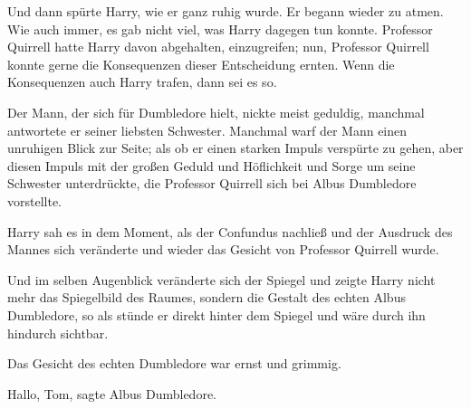 Und dann spürte Harry, wie er ganz ruhig wurde. Er begann wieder zu atmen. Wie
auch immer, es gab nicht viel, was Harry dagegen tun konnte. Professor Quirrell
hatte Harry davon abgehalten, einzugreifen; nun, Professor Quirrell konnte gerne
die Konsequenzen dieser Entscheidung ernten. Wenn die Konsequenzen auch Harry
trafen, dann sei es so.

Der Mann, der sich für Dumbledore hielt, nickte meist geduldig, manchmal
antwortete er seiner liebsten Schwester. Manchmal warf der Mann einen unruhigen
Blick zur Seite; als ob er einen starken Impuls verspürte zu gehen, aber diesen
Impuls mit der großen Geduld und Höflichkeit und Sorge um seine Schwester
unterdrückte, die Professor Quirrell sich bei Albus Dumbledore vorstellte.

Harry sah es in dem Moment, als der Confundus nachließ und der Ausdruck des
Mannes sich veränderte und wieder das Gesicht von Professor Quirrell wurde.

Und im selben Augenblick veränderte sich der Spiegel und zeigte Harry nicht mehr
das Spiegelbild des Raumes, sondern die Gestalt des echten Albus Dumbledore, so
als stünde er direkt hinter dem Spiegel und wäre durch ihn hindurch sichtbar.

Das Gesicht des echten Dumbledore war ernst und grimmig.

\glqq{}Hallo, Tom\grqq{}, sagte Albus Dumbledore.

